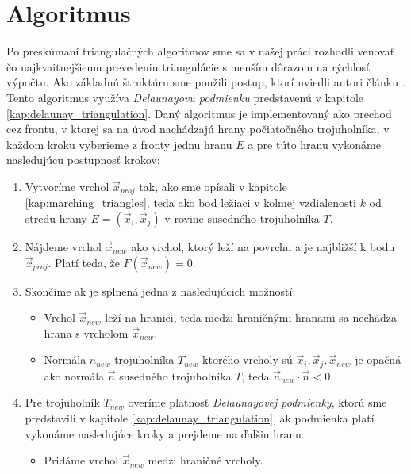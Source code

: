 \chapter{Algoritmus}

Po preskúmaní triangulačných algoritmov sme sa v našej práci rozhodli venovať čo najkvaitnejšiemu
prevedeniu triangulácie s menším dôrazom na rýchlosť výpočtu. Ako základnú štruktúru sme použili 
postup, ktorí uviedli autori článku \cite{hilton1996marching}. Tento algoritmus využíva 
\textit{Delaunayovu podmienku} predstavenú v kapitole \ref{kap:delaunay_triangulation}.
Daný algoritmus je implementovaný ako prechod cez frontu, v ktorej sa na úvod nachádzajú
hrany počiatočného trojuholníka, v každom kroku vyberieme z fronty jednu hranu $E$ a pre túto
hranu vykonáme nasledujúcu postupnosť krokov:
\begin{enumerate}
    \item{Vytvoríme vrchol $\overrightarrow{x}_{proj}$ tak, ako sme opísali v kapitole \ref{kap:marching_triangles}, teda 
    ako bod ležiaci v kolmej vzdialenosti $k$ od stredu hrany $E = (\overrightarrow{x}_i, \overrightarrow{x}_j)$ 
    v rovine susedného trojuholníka $T$.}
    \item{Nájdeme vrchol $\overrightarrow{x}_{new}$ ako vrchol, ktorý leží na povrchu a je najbližší k bodu 
    $\overrightarrow{x}_{proj}$. 
    Platí teda, že $F(\overrightarrow{x}_{new}) = 0$.}
    \item{Skončíme ak je splnená jedna z nasledujúcich možností:
    \begin{itemize}
        \item{Vrchol $\overrightarrow{x}_{new}$ leží na hranici, teda medzi hraničnými 
        hranami sa nechádza hrana s vrcholom $\overrightarrow{x}_{new}$.}
        \item{Normála $n_{new}$ trojuholníka $T_{new}$ ktorého vrcholy sú $\overrightarrow{x}_i, 
        \overrightarrow{x}_j, \overrightarrow{x}_{new}$ je opačná ako
        normála $\overrightarrow{n}$ susedného trojuholníka $T$, teda 
        $\overrightarrow{n}_{new} \cdot \overrightarrow{n} < 0$.}
    \end{itemize}
    }
    \item{Pre trojuholník $T_{new}$ overíme platnosť \textit{Delaunayovej podmienky}, 
    ktorú sme predstavili v kapitole \ref{kap:delaunay_triangulation}, ak podmienka platí
    vykonáme nasledujúce kroky a prejdeme na ďalšiu hranu.
    \begin{itemize}
        \item{Pridáme vrchol $\overrightarrow{x}_{new}$ medzi hraničné vrcholy.}

\end{itemize}}
\end{enumerate}
